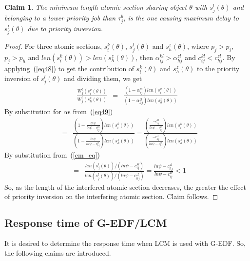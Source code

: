 \documentclass[conference]{IEEEtran}
\newtheorem{clm}{Claim}
\begin{document}
\begin{clm}
\label{max_pri_inv}
The minimum length atomic section sharing object $\theta$ with $s_j^l(\theta)$ and belonging to a lower priority job than $\tau_j^b$, is the one causing maximum delay to $s_j^l(\theta)$ due to priority inversion.
\end{clm}

\begin{proof}
For three atomic sections, $s_i^k(\theta)$, $s_j^l(\theta)$ and $s_h^z(\theta)$, where $p_j>p_i$, $p_j>p_h$ and $len(s_i^k(\theta))>len(s_h^z(\theta))$, then $\alpha_{ij}^{kl}>\alpha_{hj}^{zl}$ and $c_{ij}^{kl}<c_{hj}^{zl}$. By applying~(\ref{eq48}) to get the contribution of $s_i^k(\theta)$ and $s_h^z(\theta)$ to the priority inversion of $s_j^l(\theta)$ and dividing them, we get
\begin{eqnarray*}
\frac{W_{j}^{l}(s_{i}^{k}(\theta))}{W_{j}^{l}(s_{h}^{z}(\theta))} & = & \frac{\left(1-\alpha_{ij}^{kl}\right)len(s_{i}^{k}(\theta))}{\left(1-\alpha_{hj}^{zl}\right)len(s_{h}^{z}(\theta))}
\end{eqnarray*}
By substitution for $\alpha$s from~(\ref{eq49})
\begin{eqnarray*}
 & = & \frac{(1-\frac{ln\psi}{ln\psi-c_{ij}^{kl}})len(s_{i}^{k}(\theta))}{(1-\frac{ln\psi}{ln\psi-c_{hj}^{zl}})len(s_{h}^{z}(\theta))}
  =  \frac{(\frac{-c_{ij}^{kl}}{ln\psi-c_{ij}^{kl}})len(s_{i}^{k}(\theta))}{(\frac{-c_{hj}^{zl}}{ln\psi-c_{hj}^{zl}})len(s_{h}^{z}(\theta))}\end{eqnarray*}
By substitution from~(\ref{cm_eq})
\begin{eqnarray*}
 & = & \frac{len(s_{j}^{l}(\theta))/(ln\psi-c_{ij}^{kl})}{len(s_{j}^{l}(\theta))/(ln\psi-c_{hj}^{zl})}
  =  \frac{ln\psi-c_{hj}^{zl}}{ln\psi-c_{ij}^{kl}}<1\end{eqnarray*}
So, as the length of the interfered atomic section decreases, the greater the effect of priority inversion on the interfering atomic section. Claim follows.

\end{proof}

\subsection{\label{response g-edf/lcm} Response time of G-EDF/LCM}

It is desired to determine the response time when LCM is used with G-EDF. So, the following claims are introduced.
\end{document}
